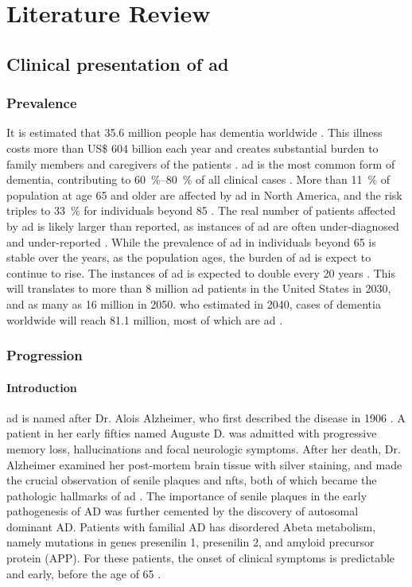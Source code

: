 \chapter{Literature Review}

\section{Clinical presentation of \gls{ad}}
\subsection{Prevalence}
It is estimated that 35.6 million people has dementia worldwide \citep{who13}. This illness costs more than US\$ 604 billion each year and creates substantial burden to family members and caregivers of the patients \citep{who13}. \gls{ad} is the most common form of dementia, contributing to \SIrange{60}{80}{\percent}  of all clinical cases \citep{ad16}. More than \SI{11}{\percent} of population at age 65 and older are affected by \gls{ad} in North America, and the risk triples to \SI{33}{\percent} for individuals beyond 85 \citep{hebert13}. The real number of patients affected by \gls{ad} is likely larger than reported, as instances of \gls{ad} are often under-diagnosed and under-reported \citep{barrett06, zaleta12}. While the prevalence of \gls{ad} in individuals beyond 65 is stable over the years, as the population ages, the burden of \gls{ad} is expect to continue to rise. The instances of \gls{ad} is expected to double every 20 years \citep{who13, hebert13}. This will translates to more than 8 million \gls{ad} patients in the United States in 2030, and as many as 16 million in 2050. \gls{who} estimated in 2040, cases of dementia worldwide will reach 81.1 million, most of which are \gls{ad} \citep{who13}. 

\subsection{Progression}
\subsubsection{Introduction}

\gls{ad} is named after Dr. Alois Alzheimer, who first described the disease in 1906 \citep{goedert06}. A patient in her early fifties named Auguste D. was admitted with progressive memory loss, hallucinations and focal neurologic symptoms. After her death, Dr. Alzheimer examined her post-mortem brain tissue with silver staining, and made the crucial observation of senile plaques and \glspl{nft}, both of which became the pathologic hallmarks of \gls{ad} \citep{goedert06, dubois16}. The importance of senile plaques in the early pathogenesis of AD was further cemented by the discovery of autosomal dominant AD. Patients with familial AD has disordered Abeta metabolism, namely mutations in genes presenilin 1, presenilin 2, and amyloid precursor protein (APP). For these patients, the onset of clinical symptoms is predictable and early, before the age of 65 \citep{geodert06, dubois16}.

